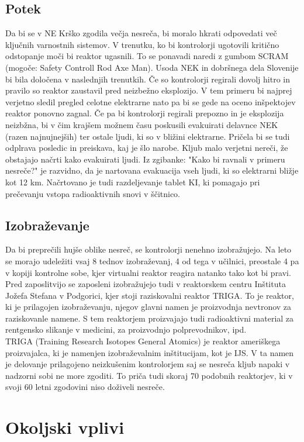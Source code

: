 \documentclass[a4paper,12pt]{article}
\begin{document}
\subsection{Potek}
Da bi se v NE Krško zgodila večja nesreča, bi moralo hkrati odpovedati več ključnih varnostnih sistemov. V trenutku, ko bi kontrolorji ugotovili kritično odstopanje moči bi reaktor ugasnili. To se ponavadi naredi z gumbom SCRAM (mogoče: Safety Controll Rod Axe Man). Usoda NEK in dobršnega dela Slovenije bi bila določena v naslednjih trenutkih. Če so kontrolorji regirali dovolj hitro in pravilo so reaktor zaustavil pred neizbežno eksplozijo. V tem primeru bi najprej verjetno sledil pregled celotne elektrarne nato pa bi se gede na oceno inšpektojev reaktor ponovno zagnal.
Če pa bi kontrolorji regirali prepozno in je eksplozija neizbžna, bi v čim  krajšem možnem času poskusili evakuirati delavnce NEK (razen najnujnejših) ter ostale ljudi, ki so v bližini elektrarne. Pričela bi se tudi odplrava posledic in preiskava, kaj je šlo narobe. Kljub malo verjetni nereči, že obstajajo načrti kako evakuirati ljudi. Iz zgibanke: "Kako bi ravnali v primeru nesreče?" je razvidno, da je nartovana evakuacija vseh ljudi, ki so elektrarni bližje kot 12 km. Načrtovano je tudi razdeljevanje tablet KI, ki pomagajo pri prečevanju vstopa radioaktivnih snovi v ščitnico.
\subsection{Izobraževanje}
Da bi preprečili hujše oblike nesreč, se kontrolorji nenehno izobražujejo. Na leto se morajo udeležiti vsaj 8 tednov izobraževanj, 4 od tega v učilnici, preostale 4 pa v kopiji kontrolne sobe, kjer virtualni reaktor reagira natanko tako kot bi pravi. Pred zaposlitvijo se zaposleni izobražujejo tudi v reaktorskem centru Inštituta Jožefa Stefana v Podgorici, kjer stoji raziskovalni reaktor TRIGA. To je reaktor, ki je prilagojen izobraževanju, njegov glavni namen je proizvodnja nevtronov za raziskovanle namene. S tem reaktorjem proizvajajo tudi radioaktivni material za rentgensko slikanje v medicini, za proizvodnjo polprevodnikov, ipd.\\
TRIGA (Training Research Isotopes General Atomics) je reaktor ameriškega proizvajalca, ki je namenjen izobraževalnim inštitucijam, kot je IJS. V ta namen je delovanje prilagojeno neizkušenim kontrolorjem saj se nesreča kljub napaki v nadzorni sobi ne more zgoditi. To priča tudi skoraj 70 podobnih reaktorjev, ki v svoji 60 letni zgodovini niso doživeli nesreče.
\newpage
\section{Okoljski vplivi}
\end{document}
